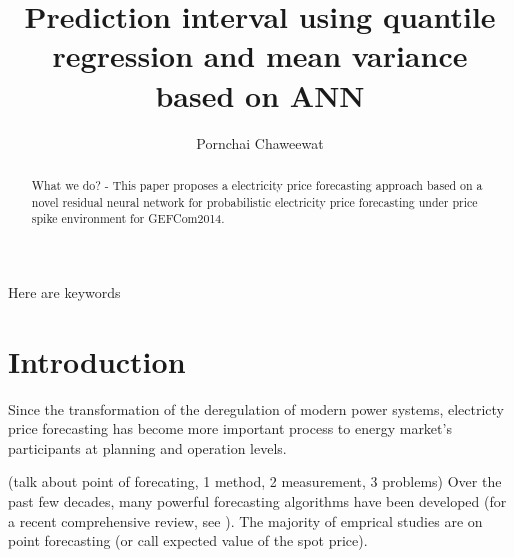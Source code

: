 \documentclass[review]{elsarticle}
\begin{document}
\begin{frontmatter}

\title{Prediction interval using quantile regression and mean variance based on ANN}

\author{Pornchai Chaweewat}

\address{AIT}

%
%

\begin{abstract}
What we do? - This paper proposes a electricity price forecasting approach based on a novel residual neural network for probabilistic electricity price forecasting under price spike environment for GEFCom2014.


\end{abstract}

\begin{keyword}
Here are keywords
\end{keyword}

\end{frontmatter}

\linenumbers

\section{Introduction}

  Since the transformation of the deregulation of modern power systems, electricty price forecasting has become more important process to energy market's participants at planning and operation levels.

  (talk about point of forecating, 1 method, 2 measurement, 3 problems) Over the past few decades, many powerful forecasting algorithms have been developed (for a recent comprehensive review, see \cite{Weron2014}). The majority of emprical studies are on point forecasting (or call expected value of the spot price).
\end{document}
